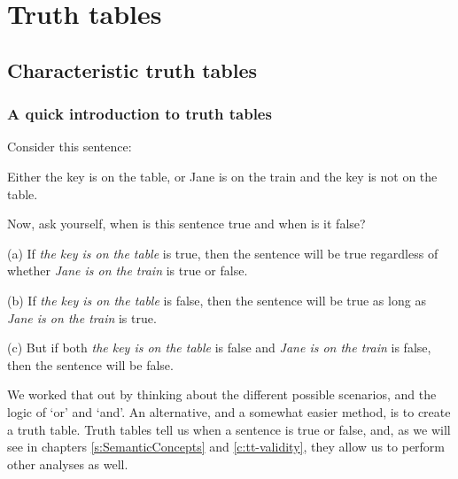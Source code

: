 \graphicspath{{figures--tt/}}
\part{Truth tables}
\label{ch.TruthTables}

\chapter{Characteristic truth tables}\label{s:CharacteristicTruthTables}


\section{A quick introduction to truth tables}

Consider this sentence: 
\begin{earg}
	\item[] Either the key is on the table, or Jane is on the train and the key is not on the table.
\end{earg}
Now, ask yourself, when is this sentence true and when is it false? 
\begin{earg}
\item[(a)] If \textit{the key is on the table} is true, then the sentence will be true regardless of whether \textit{Jane is on the train} is true or false. 
\item[(b)] If \textit{the key is on the table} is false, then the sentence will be true as long as \textit{Jane is on the train} is true. 
\item[(c)] But if both \textit{the key is on the table} is false and \textit{Jane is on the train} is false, then the sentence will be false. 
\end{earg}
We worked that out by thinking about the different possible scenarios, and the logic of `or' and `and'. An alternative, and a somewhat easier method, is to create a truth table. Truth tables tell us when a sentence is true or false, and, as we will see in chapters \ref{s:SemanticConcepts} and \ref{c:tt-validity}, they allow us to perform other analyses as well. 

